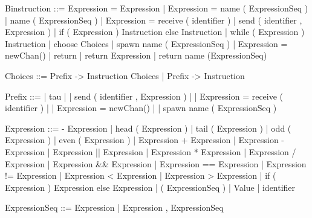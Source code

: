 \documentclass[11pt]{report}
\begin{document}
\begin{verbnobox}[\normalfont]
Binstruction ::= Expression = Expression 
                 | Expression = name ( ExpressionSeq )
                 | name ( ExpressionSeq )
                 | Expression = receive ( identifier )
                 | send ( identifier , Expression )
                 | if ( Expression ) { Instruction } else { Instruction }
                 | while ( Expression ) { Instruction }
                 | choose { Choices }
                 | spawn name ( ExpressionSeq )
                 | Expression = newChan()
                 | return
                 | return Expression
                 | return name (ExpressionSeq)
\end{verbnobox}
\vspace*{3pt}

\begin{verbnobox}[\normalfont]
Choices ::= Prefix -> { Instruction } Choices | Prefix -> { Instruction }
\end{verbnobox}
\vspace*{3pt}

\begin{verbnobox}[\normalfont]
Prefix ::= | tau
         | | send ( identifier , Expression )
         | | Expression = receive ( identifier )
         | | Expression = newChan()
         | | spawn name ( ExpressionSeq )
\end{verbnobox}
\vspace*{3pt}

\begin{verbnobox}[\normalfont]
Expression ::= - Expression
               | head ( Expression )
               | tail ( Expression )
               | odd ( Expression )
               | even ( Expression )
               | Expression + Expression
               | Expression - Expression
               | Expression || Expression
               | Expression * Expression
               | Expression / Expression
               | Expression && Expression
               | Expression == Expression
               | Expression != Expression 
               | Expression < Expression
               | Expression > Expression
               | if ( Expression ) { Expression } else { Expression }
               | ( ExpressionSeq )
               | Value
               | identifier
\end{verbnobox}
\vspace*{3pt}

\begin{verbnobox}[\normalfont]
ExpressionSeq ::= Expression | Expression , ExpressionSeq
\end{verbnobox}
\vspace*{3pt}
\end{document}
